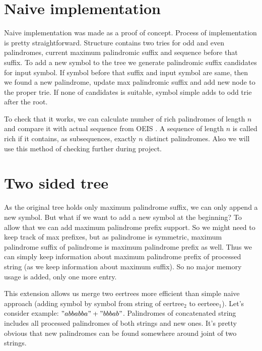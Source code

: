 \section{Naive implementation}
Naive implementation was made as a proof of concept. Process of implementation is pretty straightforward. Structure contains two tries for odd and even palindromes, current maximum palindromic suffix and sequence before that suffix. To add a new symbol to the tree we generate palindromic suffix candidates for input symbol. If symbol before that suffix and input symbol are same, then we found a new palindrome, update max palindromic suffix and add new node to the proper trie. If none of candidates is suitable, symbol simple adds to odd trie after the root. 

To check that it works, we can calculate number of rich palindromes of length $n$ and compare it with actual sequence from OEIS \cite{oeisA216264}. A sequence of length $n$ is called rich if it contains, as subsequences, exactly $n$ distinct palindromes. Also we will use this method of checking further during project.
\section{Two sided tree}
As the original tree \cite{RUBINCHIK2018249} holds only maximum palindrome suffix, we can only append a new symbol. But what if we want to add a new symbol at the beginning? To allow that we can add maximum palindrome prefix support. So we might need to keep track of max prefixes, but as palindrome is symmetric, maximum palindrome suffix of palindrome is maximum palindrome prefix as well. Thus we can simply keep information about maximum palindrome prefix of processed string (as we keep information about maximum suffix). So no major memory usage is added, only one more entry.

This extension allows us merge two eertrees more efficient than simple naive approach (adding symbol by symbol from string of eertree$_2$ to eerteee$_1$). Let's consider example: $"abbabba" + "bbbab"$.
Palindromes of concatenated string includes all processed palindromes of both strings and new ones. It's pretty obvious that new palindromes can be found somewhere around joint of two strings. 

